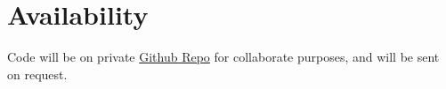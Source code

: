 \section*{Availability}

Code will be on private \href{https://github.com/NeverBehave/cse221-project}{Github Repo} for collaborate purposes, and will be sent on request.






